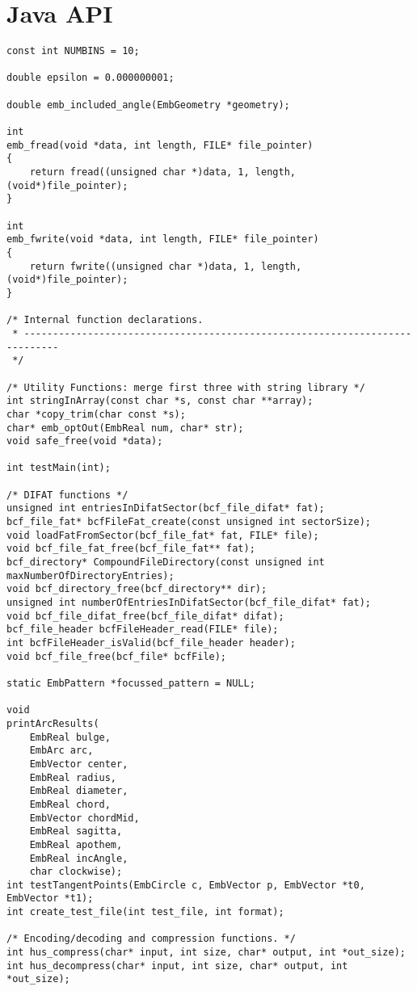 \section{Java API}

\begin{lstlisting}
const int NUMBINS = 10;

double epsilon = 0.000000001;

double emb_included_angle(EmbGeometry *geometry);

int
emb_fread(void *data, int length, FILE* file_pointer)
{
    return fread((unsigned char *)data, 1, length, (void*)file_pointer);
}

int
emb_fwrite(void *data, int length, FILE* file_pointer)
{
    return fwrite((unsigned char *)data, 1, length, (void*)file_pointer);
}

/* Internal function declarations.
 * ----------------------------------------------------------------------------
 */

/* Utility Functions: merge first three with string library */
int stringInArray(const char *s, const char **array);
char *copy_trim(char const *s);
char* emb_optOut(EmbReal num, char* str);
void safe_free(void *data);

int testMain(int);

/* DIFAT functions */
unsigned int entriesInDifatSector(bcf_file_difat* fat);
bcf_file_fat* bcfFileFat_create(const unsigned int sectorSize);
void loadFatFromSector(bcf_file_fat* fat, FILE* file);
void bcf_file_fat_free(bcf_file_fat** fat);
bcf_directory* CompoundFileDirectory(const unsigned int maxNumberOfDirectoryEntries);
void bcf_directory_free(bcf_directory** dir);
unsigned int numberOfEntriesInDifatSector(bcf_file_difat* fat);
void bcf_file_difat_free(bcf_file_difat* difat);
bcf_file_header bcfFileHeader_read(FILE* file);
int bcfFileHeader_isValid(bcf_file_header header);
void bcf_file_free(bcf_file* bcfFile);

static EmbPattern *focussed_pattern = NULL;

void
printArcResults(
    EmbReal bulge,
    EmbArc arc,
    EmbVector center,
    EmbReal radius,
    EmbReal diameter,
    EmbReal chord,
    EmbVector chordMid,
    EmbReal sagitta,
    EmbReal apothem,
    EmbReal incAngle,
    char clockwise);
int testTangentPoints(EmbCircle c, EmbVector p, EmbVector *t0, EmbVector *t1);
int create_test_file(int test_file, int format);

/* Encoding/decoding and compression functions. */
int hus_compress(char* input, int size, char* output, int *out_size);
int hus_decompress(char* input, int size, char* output, int *out_size);


\end{lstlisting}
